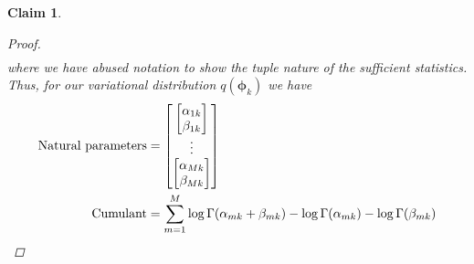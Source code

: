 \documentclass[11pt]{article}
\newtheorem{claim}{Claim}
\begin{document}
\begin{appendices}
\begin{claim}
\begin{proof}
\begin{align*}
\end{align*}
where we have abused notation to show the tuple nature of the sufficient statistics. Thus, for our variational distribution $q(\bm{\phi}_k)$ we have
\begin{align}
\text{Natural parameters} &=  			\begin{bmatrix}
				\begin{bmatrix}
				\alpha_{1k} \\ \beta_{1k} 
				\end{bmatrix} \\
				\vdots \\
				\begin{bmatrix}
				\alpha_{Mk} \\ \beta_{Mk}
				\end{bmatrix}
			\end{bmatrix} \\
\text{Cumulant} &= \sum\limits_{m=1}^M \log \Gamma(\alpha_{mk} + \beta_{mk}) - \log \Gamma(\alpha_{mk}) - \log\Gamma(\beta_{mk}) \qedhere
\end{align}
\end{proof}
\end{claim}


\end{appendices}
\end{document}
